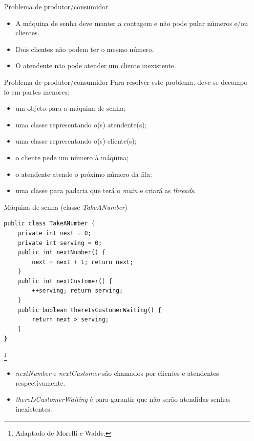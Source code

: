 \documentclass[11pt,justified]{beamer}
\newcommand\blfootnote[1]{%
  \begingroup
  \renewcommand\thefootnote{}\footnote{#1}%
  \addtocounter{footnote}{-1}%
  \endgroup
}
\begin{document}
\begin{frame}{Problema de produtor/consumidor}
    \begin{itemize}
        \item A máquina de senha deve manter a contagem e não pode pular números e/ou clientes.
        \item Dois clientes não podem ter o mesmo número.
        \item O atendente não pode atender um cliente inexistente.
    \end{itemize}
\end{frame}

\begin{frame}{Problema de produtor/consumidor}
    Para resolver este problema, deve-se decompo-lo em partes menores:
    \begin{itemize}
        \item um objeto para a máquina de senha;
        \item uma classe representando o(s) atendente(s);
        \item uma classe representando o(s) cliente(s);
        \item o cliente pede um número à máquina;
        \item o atendente atende o próximo número da fila;
        \item uma classe para padaria que terá o \textit{main} e criará as \textit{threads}.
    \end{itemize}
\end{frame}


\begin{frame}[fragile]{Máquina de senha (classe \textit{TakeANumber})}
    \begin{lstlisting}
public class TakeANumber {
    private int next = 0;
    private int serving = 0;
    public int nextNumber() {
        next = next + 1; return next;
    }
    public int nextCustomer() {
        ++serving; return serving;
    }
    public boolean thereIsCustomerWaiting() {
        return next > serving;
    }
}
    \end{lstlisting}\blfootnote{Adaptado de Morelli e Walde.}
    \begin{itemize}
        \item \textit{nextNumber} e \textit{nextCustomer} são chamados por clientes e atendentes respectivamente.
        \item \textit{thereIsCustomerWaiting} é para garantir que não serão atendidas senhas inexistentes.
    \end{itemize}
\end{frame}
\end{document}
